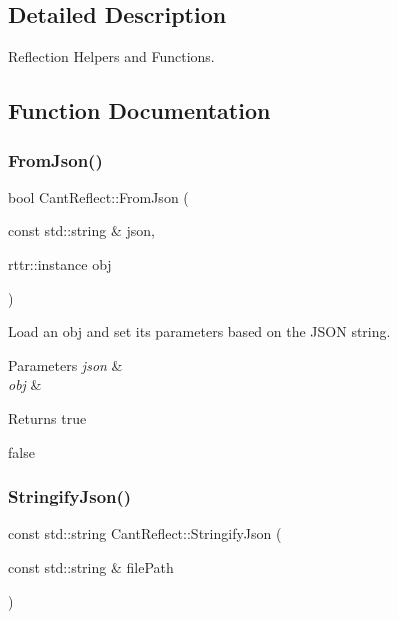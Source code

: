 \subsection{Detailed Description}
Reflection Helpers and Functions. 

\subsection{Function Documentation}
\mbox{\label{namespaceCantReflect_a9f92a2d70c4eee62a67e9931f75f36ab}} 
\subsubsection{\texorpdfstring{From\+Json()}{FromJson()}}
{\footnotesize\ttfamily bool Cant\+Reflect\+::\+From\+Json (\begin{DoxyParamCaption}\item[{const std\+::string \&}]{json,  }\item[{rttr\+::instance}]{obj }\end{DoxyParamCaption})}



Load an obj and set its parameters based on the J\+S\+ON string. 


\begin{DoxyParams}{Parameters}
{\em json} & \\
\hline
{\em obj} & \\
\hline
\end{DoxyParams}
\begin{DoxyReturn}{Returns}
true 

false 
\end{DoxyReturn}
\mbox{\label{namespaceCantReflect_a9503ff01819825b8309343e134fecf40}} 
\subsubsection{\texorpdfstring{Stringify\+Json()}{StringifyJson()}}
{\footnotesize\ttfamily const std\+::string Cant\+Reflect\+::\+Stringify\+Json (\begin{DoxyParamCaption}\item[{const std\+::string \&}]{file\+Path }\end{DoxyParamCaption})}



